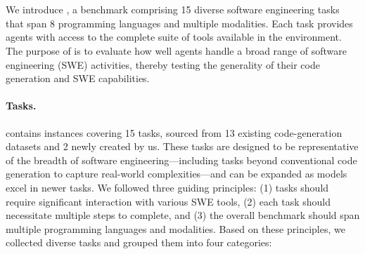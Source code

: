 
\section{\bench{}}
\label{sec:bench}

We introduce \bench{}, a benchmark comprising 15 diverse software engineering tasks that span 8 programming languages and multiple modalities. Each task provides agents with access to the complete suite of tools available in the \ours{} environment. The purpose of \bench{} is to evaluate how well agents handle a broad range of software engineering (SWE) activities, thereby testing the generality of their code generation and SWE capabilities.

\paragraph{Tasks.}
\label{sec:bench_tasks}
\bench{} contains \benchsize{} instances covering 15 tasks, sourced from 13 existing code-generation datasets and 2 newly created by us. 
These tasks are designed to be representative of the breadth of software engineering—including tasks beyond conventional code generation to capture real-world complexities—and can be expanded as models excel in newer tasks. 
We followed three guiding principles: (1) tasks should require significant interaction with various SWE tools, (2) each task should necessitate multiple steps to complete, and (3) the overall benchmark should span multiple programming languages and modalities. 
Based on these principles, we collected diverse tasks and grouped them into four categories:

